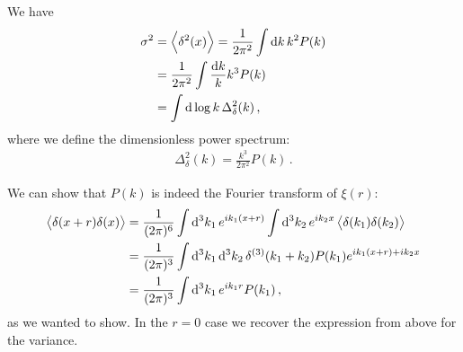 \documentclass[main.tex]{subfiles}
\begin{document}
We have 
%
\begin{align}
\sigma^2 &= \expval{ \delta^2(x)}
= \frac{1}{2 \pi^2} \int \dd{k} k^2 P(k)  \\
&= \frac{1}{2 \pi^2} \int \frac{ \dd{k}}{k} k^3 P(k)  \\
&= \int \dd{\log k } \Delta^2_\delta  (k)
\,,
\end{align}
%
where we define the dimensionless power spectrum: 
%
\begin{align}
\Delta^2_\delta (k) = \frac{k^3}{2 \pi^2} P(k)
\,.
\end{align}

We can show that \(P(k)\) is indeed the Fourier transform of \(\xi (r)\): 
%
\begin{align}
\expval{ \delta (x+r) \delta (x)} &= \frac{1}{(2 \pi )^6}
\int \dd[3]{k_1 } e^{i k_1 (x+r)} \int \dd[3]{k_2 } e^{i k_2 x} 
\expval{\delta (k_1 ) \delta (k_2 )}  \\
&= \frac{1}{(2 \pi )^3} \int \dd[3]{k_1 } \dd[3]{k_2 } \delta^{(3)} (k_1 + k_2 ) P(k_1 ) e^{i k_1 (x+r) + i k_2 x}  \\
&= \frac{1}{(2 \pi )^3} \int \dd[3]{k_1 } e^{i k_1 r} P(k_1 )
\,,
\end{align}
%
as we wanted to show. 
In the \(r = 0\) case we recover the expression from above for the variance. 
\end{document}
